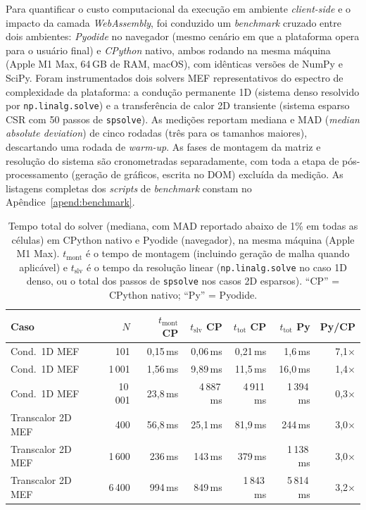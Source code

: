 Para quantificar o custo computacional da execução em ambiente \textit{client-side} e o impacto da camada \textit{WebAssembly}, foi conduzido um \textit{benchmark} cruzado entre dois ambientes: \textit{Pyodide} no navegador (mesmo cenário em que a plataforma opera para o usuário final) e \textit{CPython} nativo, ambos rodando na mesma máquina (Apple M1 Max, 64\,GB de RAM, macOS), com idênticas versões de NumPy e SciPy. Foram instrumentados dois solvers MEF representativos do espectro de complexidade da plataforma: a condução permanente 1D (sistema denso resolvido por \texttt{np.linalg.solve}) e a transferência de calor 2D transiente (sistema esparso CSR com 50 passos de \texttt{spsolve}). As medições reportam mediana e MAD (\textit{median absolute deviation}) de cinco rodadas (três para os tamanhos maiores), descartando uma rodada de \textit{warm-up}. As fases de montagem da matriz e resolução do sistema são cronometradas separadamente, com toda a etapa de pós-processamento (geração de gráficos, escrita no DOM) excluída da medição. As listagens completas dos \textit{scripts} de \textit{benchmark} constam no Apêndice~\ref{apend:benchmark}.

\begin{table}[H]
\centering
\caption{Tempo total do solver (mediana, com MAD reportado abaixo de 1\% em todas as células) em CPython nativo e Pyodide (navegador), na mesma máquina (Apple M1 Max). $t_{\text{mont}}$ é o tempo de montagem (incluindo geração de malha quando aplicável) e $t_{\text{slv}}$ é o tempo da resolução linear (\texttt{np.linalg.solve} no caso 1D denso, ou o total dos passos de \texttt{spsolve} nos casos 2D esparsos). ``CP'' = CPython nativo; ``Py'' = Pyodide.}
\label{tab:benchmark_runtimes}
\small
\setlength{\tabcolsep}{4pt}
\begin{tabular}{lrrrrrr}
\hline
\textbf{Caso} & \textbf{$N$} & \textbf{$t_{\text{mont}}$ CP} & \textbf{$t_{\text{slv}}$ CP} & \textbf{$t_{\text{tot}}$ CP} & \textbf{$t_{\text{tot}}$ Py} & \textbf{Py/CP} \\
\hline
Cond.~1D MEF        & 101     & 0,15\,ms    & 0,06\,ms    & 0,21\,ms    & 1,6\,ms      & 7,1$\times$ \\
Cond.~1D MEF        & 1\,001  & 1,56\,ms    & 9,89\,ms    & 11,5\,ms    & 16,0\,ms     & 1,4$\times$ \\
Cond.~1D MEF        & 10\,001 & 23,8\,ms    & 4\,887\,ms  & 4\,911\,ms  & 1\,394\,ms   & 0,3$\times$ \\
\hline
Transcalor 2D MEF   & 400     & 56,8\,ms    & 25,1\,ms    & 81,9\,ms    & 244\,ms      & 3,0$\times$ \\
Transcalor 2D MEF   & 1\,600  & 236\,ms     & 143\,ms     & 379\,ms     & 1\,138\,ms   & 3,0$\times$ \\
Transcalor 2D MEF   & 6\,400  & 994\,ms     & 849\,ms     & 1\,843\,ms  & 5\,814\,ms   & 3,2$\times$ \\
\hline
\end{tabular}
\end{table}

